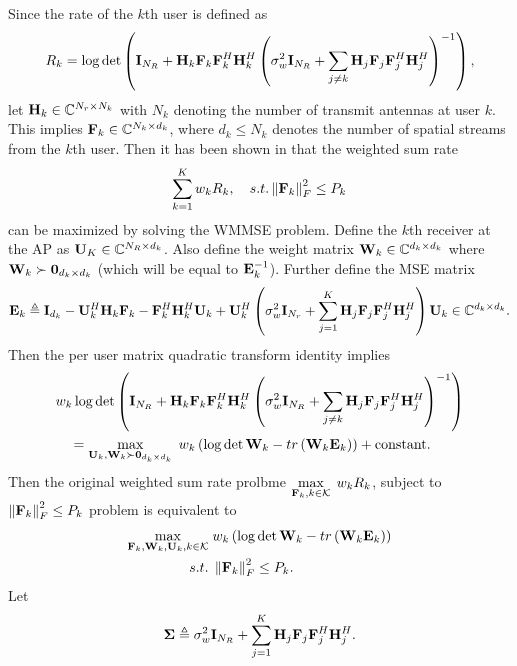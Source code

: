 \documentclass[a4paper, 12pt, onecolumn, journal, twoside, draftclsnofoot]{IEEEtran}
\begin{document}
Since the rate of the $k$th user is defined as 
\begin{equation*}
	R_k = \log \det \left(  {\bf I}_{N_R}  +  {\bf H}_k {\bf F}_k  {\bf F}_k^H {\bf H}_k^H \left(  \sigma_w^2 {\bf I}_{N_R}  + \sum_{j \neq k}  {\bf H}_j {\bf F}_j {\bf F}_j^H {\bf H}_j^H  \right)^{-1} \right), 
\end{equation*}
let ${\bf H}_k \in \mathbb{C}^{N_r \times N_k}$ with $N_k$ denoting the number of transmit antennas at user $k$.  This implies ${\bf F}_k \in \mathbb{C}^{N_k \times d_k}$, where $d_k \leq N_k$ denotes the number of spatial streams from the $k$th user.  Then it has been shown in \cite{qi2011} that the weighted sum rate
\begin{equation*}
	\sum_{k=1}^K w_k R_k, \quad s.t. \left\| {\bf F}_k \right\|_F^2 \leq P_k 
\end{equation*}
can be maximized by solving the WMMSE problem.  Define the $k$th receiver at the AP as ${\bf U}_K \in \mathbb{C}^{N_R \times d_k}$.  Also define the weight matrix ${\bf W}_k \in \mathbb{C}^{d_k \times d_k}$ where ${\bf W}_k \succ {\bf 0}_{d_k \times d_k}$ (which will be equal to ${\bf E}_k^{-1}$).  Further define the MSE matrix 
\begin{equation*}
	{\bf E}_k \triangleq {\bf I}_{d_k} - {\bf U}_k^H {\bf H}_k {\bf F}_k - {\bf F}_k^H {\bf H}_k^H {\bf U}_k + {\bf U}_k^H \left( \sigma_w^2 {\bf I}_{N_r} + \sum_{j=1}^K {\bf H}_j {\bf F}_j {\bf F}_j^H {\bf H}_j^H \right) {\bf U}_k \in \mathbb{C}^{d_k \times d_k}.
\end{equation*}
Then the per user matrix quadratic transform  identity implies
\begin{align*}
	&w_k \log\det\left( {\bf I}_{N_R}  +  {\bf H}_k {\bf F}_k  {\bf F}_k^H {\bf H}_k^H \left(  \sigma_w^2 {\bf I}_{N_R}  + \sum_{j \neq k}  {\bf H}_j {\bf F}_j {\bf F}_j^H {\bf H}_j^H  \right)^{-1} \right) \\
	&\quad = \max_{{\bf U}_k, {\bf W}_k \succ {\bf 0}_{d_k \times d_k}} \; w_k \left( \log\det {\bf W}_k - tr\left({\bf W}_k {\bf E}_k\right) \right) + \text{constant}.
\end{align*}
Then the original weighted sum rate prolbme $\displaystyle \max_{{\bf F}_k, k \in { \mathcal{K} }} \; w_k R_k$, subject to $\left\| {\bf F}_k \right\|_F^2 \leq P_k $ problem is equivalent to 
\begin{equation}
	\begin{split}
		\max_{{\bf F}_k, {\bf W}_k, {\bf U}_k, k \in { \mathcal{K} }} &\; w_k \left( \log\det {\bf W}_k - tr\left( {\bf W}_k {\bf E}_k \right) \right) \\
		s.t. &\; \left\| {\bf F}_k \right\|_F^2 \leq P_k.
	\end{split}
\label{eq_WMMSE_equiv_prob}
\end{equation}
Let 
\begin{equation*}
	{\boldsymbol{\Sigma} } \triangleq \sigma_w^2 {\bf I}_{N_R} + \sum_{j=1}^K {\bf H}_j {\bf F}_j {\bf F}_j^H {\bf H}_j^H.
\end{equation*}
\end{document}
